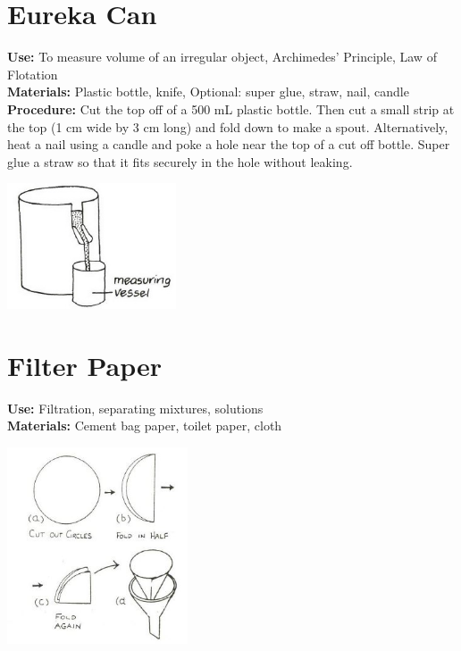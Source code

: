 \begin{multicols}{2}
\section{Eureka Can}
\label{sec:eureka-can}
\vspace{-10pt}
\textbf{Use:} To measure volume of an irregular object, Archimedes' Principle, Law of Flotation\\
\textbf{Materials:} Plastic bottle, knife, Optional: super glue, straw, nail, candle\\
\textbf{Procedure:} Cut the top off of a 500 mL plastic bottle. Then cut a small strip at the top (1 cm wide by 3 cm long) and fold down to make a spout. Alternatively, heat a nail using a candle and poke a hole near the top of a cut off bottle. Super glue a straw so that it fits securely in the hole without leaking.
\begin{center}
\includegraphics[width=5cm]{./img/vso/eureka-can.jpg}
\end{center}

\section{Filter Paper}
\label{sec:filter-paper}
\vspace{-10pt}
\textbf{Use:} Filtration, separating mixtures, solutions\\
\textbf{Materials:} Cement bag paper, toilet paper, cloth
\begin{center}
\includegraphics[width=0.4\textwidth]{./img/source/filter-paper.jpg}
\end{center}


\end{multicols}

